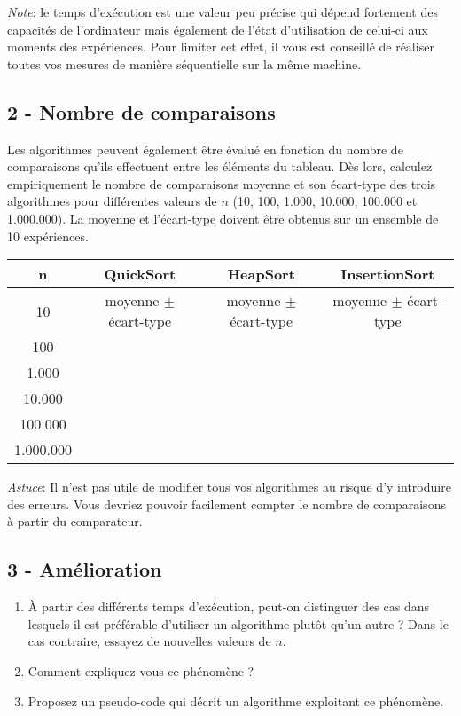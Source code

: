 \documentclass[a4paper,10pt]{article}
\begin{document}
{\em Note}: le temps d'exécution est une valeur peu précise qui dépend fortement des capacités de l'ordinateur mais également de l'état d'utilisation de celui-ci aux moments des expériences. Pour limiter cet effet, il vous est conseillé de réaliser toutes vos mesures de manière séquentielle sur la même machine.

\subsection*{2 - Nombre de comparaisons}
Les algorithmes peuvent également être évalué en fonction du nombre de comparaisons qu'ils effectuent entre les éléments du tableau. Dès lors, calculez empiriquement le nombre de comparaisons moyenne et son écart-type des trois algorithmes pour différentes valeurs de $n$ (10, 100, 1.000, 10.000, 100.000 et 1.000.000). La moyenne et l'écart-type doivent être obtenus sur un ensemble de 10 expériences.

\begin{center}
\begin{tabular}{cccc}
	\hline
	n & QuickSort & HeapSort & InsertionSort \\
	\hline
	10 & moyenne $\pm$ écart-type & moyenne $\pm$ écart-type & moyenne $\pm$ écart-type\\
	100 & & &\\
	1.000 & & &\\
	10.000 & & &\\
	100.000 & & &\\
	1.000.000 & & &\\
\end{tabular}
\end{center}

{\em Astuce}: Il n'est pas utile de modifier tous vos algorithmes au risque d'y introduire des erreurs. Vous devriez pouvoir facilement compter le nombre de comparaisons à partir du comparateur.

\subsection*{3 - Amélioration}
\begin{enumerate}
\item À partir des différents temps d'exécution, peut-on distinguer des cas dans lesquels il est préférable d'utiliser un algorithme plutôt qu'un autre ? Dans le cas contraire, essayez de nouvelles valeurs de $n$.
\item Comment expliquez-vous ce phénomène ?
\item Proposez un pseudo-code qui décrit un algorithme exploitant ce phénomène.
\end{enumerate}
\end{document}
